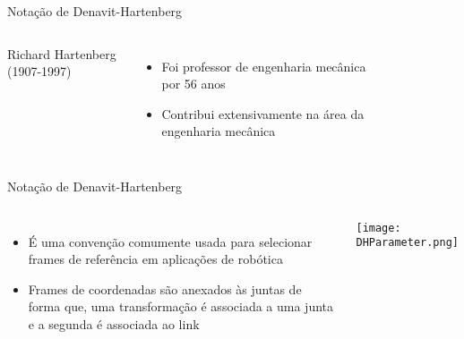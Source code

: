 \begin{frame}[t]{Notação de Denavit-Hartenberg} 
    
    \begin{columns}[c]
        Richard Hartenberg (1907-1997)
        \begin{itemize}
            \item Foi professor de engenharia mecânica por 56 anos

            \item Contribui extensivamente na área da engenharia mecânica
              \end{itemize}
            \begin{figure}
            \end{figure}
    \end{columns}
\end{frame}
\begin{frame}[c]{Notação de Denavit-Hartenberg}
    \begin{columns}
        \begin{itemize}
            \item É uma convenção comumente usada para selecionar frames de
            referência em aplicações de robótica
            \item Frames de coordenadas são anexados às juntas de forma que, uma transformação é associada a uma junta e a segunda é associada ao link
        \end{itemize}
            \centering
            \texttt{[image: DHParameter.png]}
    \end{columns}
\end{frame}
